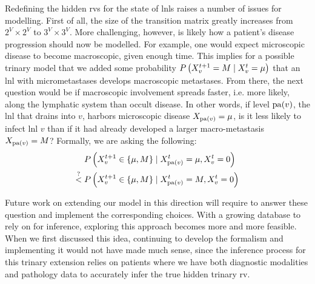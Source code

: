 \documentclass[\relativeRoot/main.tex]{subfiles}
\begin{document}
Redefining the hidden \glspl{rv} for the state of \glspl{lnl} raises a number of issues for modelling. First of all, the size of the transition matrix greatly increases from $2^V \times 2^V$ to $3^V \times 3^V$. More challenging, however, is likely how a patient's disease progression should now be modelled. For example, one would expect microscopic disease to become macroscopic, given enough time. This implies for a possible trinary model that we added some probability $P \left( X^{t+1}_v=M \mid X_v^t=\mu \right)$ that an \gls{lnl} with micrometastases develops macroscopic metastases. From there, the next question would be if macroscopic involvement spreads faster, i.e. more likely, along the lymphatic system than occult disease. In other words, if level $\operatorname{pa}(v)$, the \gls{lnl} that drains into $v$, harbors microscopic disease $X_{\operatorname{pa}(v)} = \mu$, is it less likely to infect \gls{lnl} $v$ than if it had already developed a larger macro-metastasis $X_{\operatorname{pa}(v)} = M$? Formally, we are asking the following:
%
\begin{equation}
    \begin{aligned}
        &P \left( X^{t+1}_v \in \{ \mu, M \} \mid X^t_{\operatorname{pa}(v)}=\mu, X_v^t=0 \right) \\
        \stackrel{?}{<} \; &P \left( X^{t+1}_v \in \{ \mu, M \} \mid X^t_{\operatorname{pa}(v)}=M, X_v^t=0 \right)
    \end{aligned}
\end{equation}

Future work on extending our model in this direction will require to answer these question and implement the corresponding choices. With a growing database to rely on for inference, exploring this approach becomes more and more feasible. When we first discussed this idea, continuing to develop the formalism and implementing it would not have made much sense, since the inference process for this trinary extension relies on patients where we have both diagnostic modalities and pathology data to accurately infer the true hidden trinary \gls{rv}.
\end{document}

